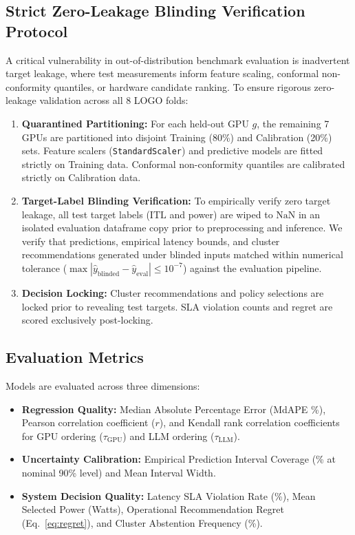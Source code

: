 \documentclass[preprint,12pt]{elsarticle}
\begin{document}
\subsection{Strict Zero-Leakage Blinding Verification Protocol}
A critical vulnerability in out-of-distribution benchmark evaluation is inadvertent target leakage, where test measurements inform feature scaling, conformal non-conformity quantiles, or hardware candidate ranking. To ensure rigorous zero-leakage validation across all 8 LOGO folds:
\begin{enumerate}
    \item \textbf{Quarantined Partitioning:} For each held-out GPU $g$, the remaining 7 GPUs are partitioned into disjoint Training (80\%) and Calibration (20\%) sets. Feature scalers (\texttt{StandardScaler}) and predictive models are fitted strictly on Training data. Conformal non-conformity quantiles are calibrated strictly on Calibration data.
    \item \textbf{Target-Label Blinding Verification:} To empirically verify zero target leakage, all test target labels ($\text{ITL}$ and power) are wiped to $\text{NaN}$ in an isolated evaluation dataframe copy prior to preprocessing and inference. We verify that predictions, empirical latency bounds, and cluster recommendations generated under blinded inputs matched within numerical tolerance ($\max |\hat{y}_{\text{blinded}} - \hat{y}_{\text{eval}}| \le 10^{-7}$) against the evaluation pipeline.
    \item \textbf{Decision Locking:} Cluster recommendations and policy selections are locked prior to revealing test targets. SLA violation counts and regret are scored exclusively post-locking.
\end{enumerate}

\subsection{Evaluation Metrics}
Models are evaluated across three dimensions:
\begin{itemize}
    \item \textbf{Regression Quality:} Median Absolute Percentage Error (MdAPE \%), Pearson correlation coefficient ($r$), and Kendall rank correlation coefficients for GPU ordering ($\tau_{\text{GPU}}$) and LLM ordering ($\tau_{\text{LLM}}$).
    \item \textbf{Uncertainty Calibration:} Empirical Prediction Interval Coverage (\% at nominal 90\% level) and Mean Interval Width.
    \item \textbf{System Decision Quality:} Latency SLA Violation Rate (\%), Mean Selected Power (Watts), Operational Recommendation Regret (Eq.~\eqref{eq:regret}), and Cluster Abstention Frequency (\%).
\end{itemize}
\end{document}
